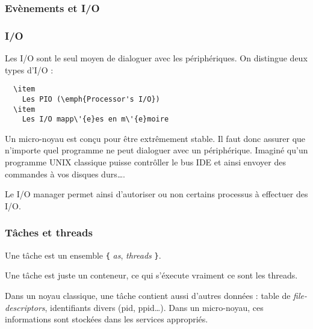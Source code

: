 
\begin{frame}
  \frametitle{Ev\`{e}nements et I/O}

\end{frame}


\begin{frame}
  \frametitle{I/O}

  Les I/O sont le seul moyen de dialoguer avec les p\'{e}riph\'{e}riques. On
  distingue deux types d'I/O :

  \begin{verbatim}
  \item
    Les PIO (\emph{Processor's I/O})
  \item
    Les I/O mapp\'{e}es en m\'{e}moire
  \end{verbatim}

  \-

  Un micro-noyau est con\c{c}u pour \^{e}tre extr\^{e}mement stable. Il faut
  donc assurer que n'importe quel programme ne peut dialoguer avec un
  p\'{e}riph\'{e}rique. Imagin\'{e} qu'un programme UNIX classique puisse
  contr\^{o}ller le bus IDE et ainsi envoyer des commandes \`{a} vos disques
  durs\ldots.

  \-

  Le I/O manager permet ainsi d'autoriser ou non certains processus à
  effectuer des I/O.

\end{frame}


\begin{frame}[containsverbatim]
  \frametitle{T\^{a}ches et threads}

  Une t\^{a}che est un ensemble \verb|{| \emph{as}, \emph{threads}
  \verb|}|.

  \begin{center}
  \end{center}

  Une t\^{a}che est juste un conteneur, ce qui s'\'{e}xecute vraiment
  ce sont les threads.

  \-

  Dans un noyau classique, une t\^{a}che contient aussi d'autres
  donn\'{e}es : table de \emph{file-descriptors}, identifiants divers
  (pid, ppid\ldots). Dans un micro-noyau, ces informations sont
  stock\'{e}es dans les services appropri\'{e}s.

\end{frame}

